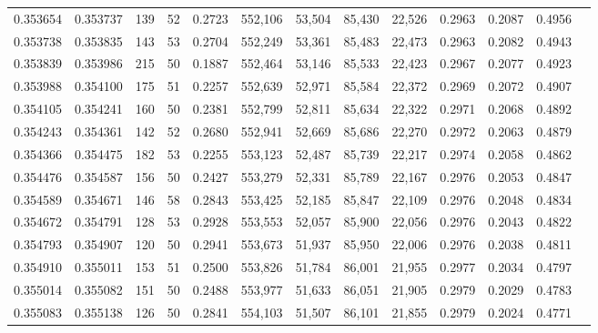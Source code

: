 \begin{tabular}{rrrrrrrrrrrrr}
0.353654 & 0.353737 &   139 &  52 &                                     0.2723 & 552,106 &  53,504 &  85,430 &  22,526 & 0.2963 & 0.2087 & 0.4956 \\
0.353738 & 0.353835 &   143 &  53 &                                     0.2704 & 552,249 &  53,361 &  85,483 &  22,473 & 0.2963 & 0.2082 & 0.4943 \\
0.353839 & 0.353986 &   215 &  50 &                                     0.1887 & 552,464 &  53,146 &  85,533 &  22,423 & 0.2967 & 0.2077 & 0.4923 \\
0.353988 & 0.354100 &   175 &  51 &                                     0.2257 & 552,639 &  52,971 &  85,584 &  22,372 & 0.2969 & 0.2072 & 0.4907 \\
0.354105 & 0.354241 &   160 &  50 &                                     0.2381 & 552,799 &  52,811 &  85,634 &  22,322 & 0.2971 & 0.2068 & 0.4892 \\
0.354243 & 0.354361 &   142 &  52 &                                     0.2680 & 552,941 &  52,669 &  85,686 &  22,270 & 0.2972 & 0.2063 & 0.4879 \\
0.354366 & 0.354475 &   182 &  53 &                                     0.2255 & 553,123 &  52,487 &  85,739 &  22,217 & 0.2974 & 0.2058 & 0.4862 \\
0.354476 & 0.354587 &   156 &  50 &                                     0.2427 & 553,279 &  52,331 &  85,789 &  22,167 & 0.2976 & 0.2053 & 0.4847 \\
0.354589 & 0.354671 &   146 &  58 &                                     0.2843 & 553,425 &  52,185 &  85,847 &  22,109 & 0.2976 & 0.2048 & 0.4834 \\
0.354672 & 0.354791 &   128 &  53 &                                     0.2928 & 553,553 &  52,057 &  85,900 &  22,056 & 0.2976 & 0.2043 & 0.4822 \\
0.354793 & 0.354907 &   120 &  50 &                                     0.2941 & 553,673 &  51,937 &  85,950 &  22,006 & 0.2976 & 0.2038 & 0.4811 \\
0.354910 & 0.355011 &   153 &  51 &                                     0.2500 & 553,826 &  51,784 &  86,001 &  21,955 & 0.2977 & 0.2034 & 0.4797 \\
0.355014 & 0.355082 &   151 &  50 &                                     0.2488 & 553,977 &  51,633 &  86,051 &  21,905 & 0.2979 & 0.2029 & 0.4783 \\
0.355083 & 0.355138 &   126 &  50 &                                     0.2841 & 554,103 &  51,507 &  86,101 &  21,855 & 0.2979 & 0.2024 & 0.4771 \\

\end{tabular}
